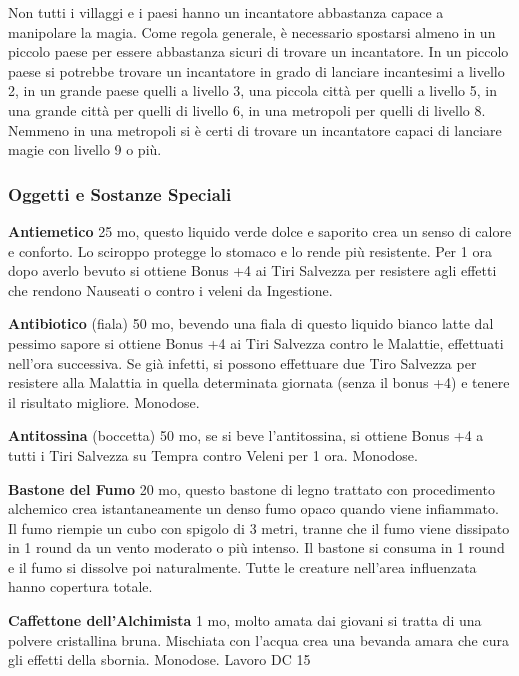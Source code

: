 \begin{multicols}{2}
Non tutti i villaggi e i paesi hanno un incantatore abbastanza capace a manipolare la magia. Come regola generale, è necessario spostarsi almeno in un piccolo paese per essere abbastanza sicuri di trovare un incantatore. In un piccolo paese si potrebbe trovare un incantatore in grado di lanciare incantesimi a livello 2, in un grande paese quelli a livello 3, una piccola città per quelli a livello 5, in una grande città per quelli di livello 6, in una metropoli per quelli di livello 8. Nemmeno in una metropoli si è certi di trovare un incantatore capaci di lanciare magie con livello 9 o più.


\subsubsection{Oggetti e Sostanze Speciali}

\textbf{Antiemetico} 25 mo, questo liquido verde dolce e saporito crea un senso di calore e conforto. Lo sciroppo protegge lo stomaco e lo rende più resistente. Per 1 ora dopo averlo bevuto si ottiene Bonus +4 ai Tiri Salvezza per resistere agli effetti che rendono Nauseati o contro i veleni da Ingestione.

\textbf{Antibiotico} (fiala) 50 mo, bevendo una fiala di questo liquido bianco latte dal pessimo sapore si ottiene Bonus +4 ai Tiri Salvezza contro le Malattie, effettuati nell'ora successiva. Se già infetti, si possono effettuare due Tiro Salvezza per resistere alla Malattia in quella determinata giornata (senza il bonus +4) e tenere il risultato migliore. Monodose.

\textbf{Antitossina} (boccetta) 50 mo, se si beve l'antitossina, si ottiene Bonus +4 a tutti i Tiri Salvezza su Tempra contro Veleni per 1 ora. Monodose.

\textbf{Bastone del Fumo} 20 mo, questo bastone di legno trattato con procedimento alchemico crea istantaneamente un denso fumo opaco quando viene infiammato. Il fumo riempie un cubo con spigolo di 3 metri, tranne che il fumo viene dissipato in 1 round da un vento moderato o più intenso. Il bastone si consuma in 1 round e il fumo si dissolve poi naturalmente. Tutte le creature nell'area influenzata hanno copertura totale.

\textbf{Caffettone dell'Alchimista} 1 mo, molto amata dai giovani si tratta di una polvere cristallina bruna. Mischiata con l'acqua crea una bevanda amara che cura gli effetti della sbornia. Monodose. Lavoro DC 15


\end{multicols}

